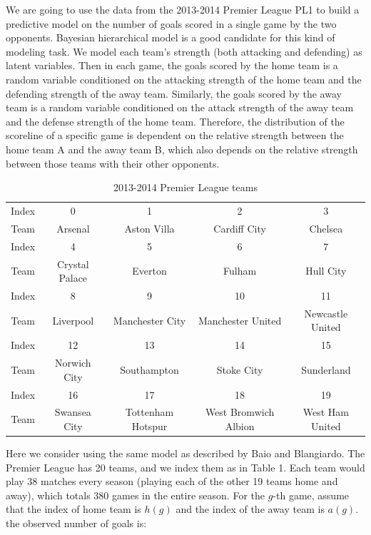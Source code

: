 \documentclass{article}
\begin{document}
We are going to use the data from the 2013-2014 Premier League PL1 to build a predictive model on the
number of goals scored in a single game by the two opponents. Bayesian hierarchical model is a good
candidate for this kind of modeling task. We model each team's strength (both attacking and defending) as
latent variables. Then in each game, the goals scored by the home team is a random variable conditioned
on the attacking strength of the home team and the defending strength of the away team. Similarly, the
goals scored by the away team is a random variable conditioned on the attack strength of the away team
and the defense strength of the home team. Therefore, the distribution of the scoreline of a specific game is
dependent on the relative strength between the home team A and the away team B, which also depends on
the relative strength between those teams with their other opponents.

\begin{table}[h]
\centering
\caption{2013-2014 Premier League teams}
\begin{tabular}{ccccc}
\hline
Index & 0 & 1 & 2 & 3 \\
Team & Arsenal & Aston Villa & Cardiff City & Chelsea \\
\hline
Index & 4 & 5 & 6 & 7 \\
Team & Crystal Palace & Everton & Fulham & Hull City \\
\hline
Index & 8 & 9 & 10 & 11 \\
Team & Liverpool & Manchester City & Manchester United & Newcastle United \\
\hline
Index & 12 & 13 & 14 & 15 \\
Team & Norwich City & Southampton & Stoke City & Sunderland \\
\hline
Index & 16 & 17 & 18 & 19 \\
Team & Swansea City & Tottenham Hotspur & West Bromwich Albion & West Ham United \\
\hline
\end{tabular}
\end{table}

Here we consider using the same model as described by Baio and Blangiardo. The Premier League has
20 teams, and we index them as in Table 1. Each team would play 38 matches every season (playing each of
the other 19 teams home and away), which totals 380 games in the entire season. For the $g$-th game, assume
that the index of home team is $h(g)$ and the index of the away team is $a(g)$. the observed number of goals
is:
\end{document}
